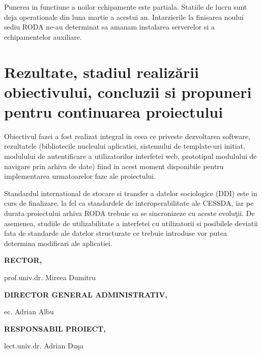 \documentclass[a4paper, 10pt]{article}
\begin{document}
Punerea in functiune a noilor echipamente este partiala. 
Statiile de lucru sunt deja operationale din luna martie a acestui an. 
Intarzierile la finisarea noului sediu RODA ne-au determinat sa amanam instalarea serverelor si a
echipamentelor auxiliare.

\section{Rezultate, stadiul realiz\u{a}rii obiectivului, concluzii si propuneri pentru continuarea proiectului}

Obiectivul fazei a fost realizat integral in ceea ce priveste dezvoltarea software, 
rezultatele 
(bibliotecile nucleului aplicatiei, 
sistemului de template-uri initiat, 
modulului de autentificare a utilizatorilor interfetei web, 
prototipul modulului de navigare prin arhiva de date)
fiind in acest moment disponibile pentru implementarea urmatoarelor faze ale proiectului.

\medskip

Standardul international de stocare si transfer a datelor sociologice (DDI) este in curs de finalizare, la fel ca standardele de interoperabilitate ale CESSDA, iar pe durata proiectului arhiva RODA trebuie sa se sincronizeze cu aceste evolu\c{t}ii.
De asemenea, studiile de utilizabilitate a interfetei cu utilizatorii si posibilele deviatii fata de standarde ale datelor structurate ce trebuie introduse vor putea determina modificari ale aplicatiei.


\bigskip

\bigskip

\bigskip

\bigskip

\bigskip

\bigskip

\bigskip

\bigskip

{\bfseries
RECTOR,}

prof.univ.dr. Mircea Dumitru

\bigskip

\bigskip

\bigskip

\bigskip

\bigskip

\bigskip

\bigskip

\bigskip

{\bfseries
DIRECTOR GENERAL ADMINISTRATIV,}

ec. Adrian Albu

\bigskip

\bigskip

\bigskip

\bigskip

\bigskip

\bigskip

\bigskip

\bigskip

{\bfseries
RESPONSABIL PROIECT,}

lect.univ.dr. Adrian Du\c{s}a
\end{document}
